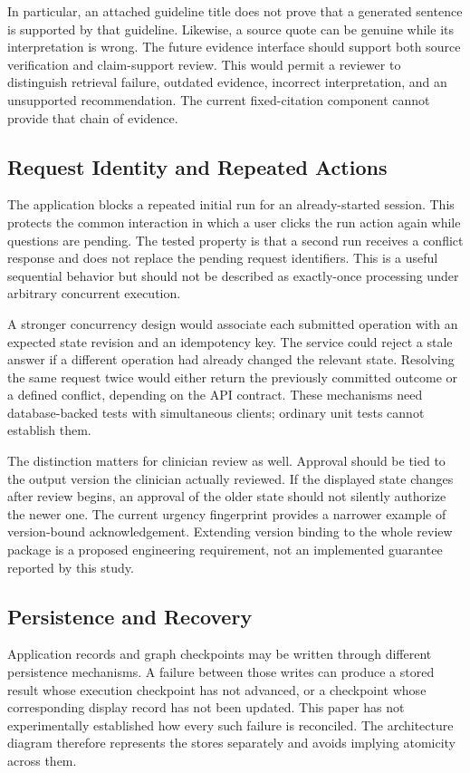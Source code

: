 \documentclass[conference]{IEEEtran}
\begin{document}
In particular, an attached guideline title does not prove that a generated sentence is supported by that guideline. Likewise, a source quote can be genuine while its interpretation is wrong. The future evidence interface should support both source verification and claim-support review. This would permit a reviewer to distinguish retrieval failure, outdated evidence, incorrect interpretation, and an unsupported recommendation. The current fixed-citation component cannot provide that chain of evidence.

\subsection{Request Identity and Repeated Actions}
The application blocks a repeated initial run for an already-started session. This protects the common interaction in which a user clicks the run action again while questions are pending. The tested property is that a second run receives a conflict response and does not replace the pending request identifiers. This is a useful sequential behavior but should not be described as exactly-once processing under arbitrary concurrent execution.

A stronger concurrency design would associate each submitted operation with an expected state revision and an idempotency key. The service could reject a stale answer if a different operation had already changed the relevant state. Resolving the same request twice would either return the previously committed outcome or a defined conflict, depending on the API contract. These mechanisms need database-backed tests with simultaneous clients; ordinary unit tests cannot establish them.

The distinction matters for clinician review as well. Approval should be tied to the output version the clinician actually reviewed. If the displayed state changes after review begins, an approval of the older state should not silently authorize the newer one. The current urgency fingerprint provides a narrower example of version-bound acknowledgement. Extending version binding to the whole review package is a proposed engineering requirement, not an implemented guarantee reported by this study.

\subsection{Persistence and Recovery}
Application records and graph checkpoints may be written through different persistence mechanisms. A failure between those writes can produce a stored result whose execution checkpoint has not advanced, or a checkpoint whose corresponding display record has not been updated. This paper has not experimentally established how every such failure is reconciled. The architecture diagram therefore represents the stores separately and avoids implying atomicity across them.
\end{document}
